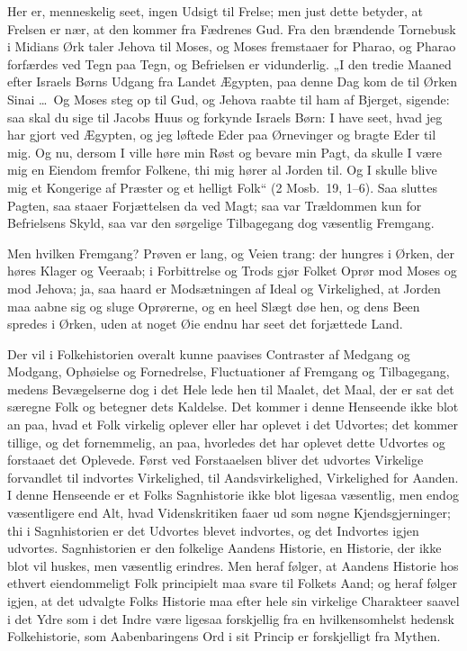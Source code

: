 \documentclass[12pt]{book}
\begin{document}
Her er, menneskelig seet, ingen Udsigt til Frelse; men just dette
betyder, at Frelsen er nær, at den kommer fra Fædrenes Gud. Fra den
brændende Tornebusk i Midians Ørk taler Jehova til Moses, og Moses
fremstaaer for Pharao, og Pharao forfærdes ved Tegn paa Tegn, og
Befrielsen er vidunderlig. „I den tredie Maaned efter Israels Børns
Udgang fra Landet Ægypten, paa denne Dag kom de til Ørken Sinai
\dots\ Og Moses steg op til Gud, og Jehova raabte til ham af
Bjerget, sigende: saa skal du sige til Jacobs Huus og forkynde
Israels Børn: I have seet, hvad jeg har gjort ved Ægypten, og jeg
løftede Eder paa Ørnevinger og bragte Eder til mig. Og nu, dersom I
ville høre min Røst og bevare min Pagt, da skulle I være mig en
Eiendom fremfor Folkene, thi mig hører al Jorden til. Og I skulle
blive mig et Kongerige af Præster og et helligt Folk“ (2 Mosb.\ 19,
1--6). Saa sluttes Pagten, saa staaer Forjættelsen da ved Magt; saa
var Trældommen kun for Befrielsens Skyld, saa var den sørgelige
Tilbagegang dog væsentlig Fremgang.

Men hvilken Fremgang? Prøven er lang, og Veien trang: der hungres i
Ørken, der høres Klager og Veeraab; i Forbittrelse og Trods gjør
Folket Oprør mod Moses og mod Jehova; ja, saa haard er Modsætningen
af Ideal og Virkelighed, at Jorden maa aabne sig og sluge Oprørerne,
og en heel Slægt døe hen, og dens Been
spredes i Ørken, uden at noget Øie endnu har seet det forjættede
Land.

Der vil i Folkehistorien overalt kunne paavises Contraster af
Medgang og Modgang, Ophøielse og Fornedrelse, Fluctuationer af
Fremgang og Tilbagegang, medens Bevægelserne dog i det Hele lede hen
til Maalet, det Maal, der er sat det særegne Folk og betegner dets
Kaldelse. Det kommer i denne Henseende ikke blot an paa, hvad et
Folk virkelig oplever eller har oplevet i det Udvortes; det kommer
tillige, og det fornemmelig, an paa, hvorledes det har oplevet dette
Udvortes og forstaaet det Oplevede. Først ved Forstaaelsen bliver
det udvortes Virkelige forvandlet til indvortes Virkelighed, til
Aandsvirkelighed, Virkelighed for Aanden. I denne Henseende er et
Folks Sagnhistorie ikke blot ligesaa væsentlig, men endog
væsentligere end Alt, hvad Videnskritiken faaer ud som nøgne
Kjendsgjerninger; thi i Sagnhistorien er det Udvortes blevet
indvortes, og det Indvortes igjen udvortes. Sagnhistorien er den
folkelige Aandens Historie, en Historie, der ikke blot vil huskes,
men væsentlig erindres. Men heraf følger, at Aandens Historie hos
ethvert eiendommeligt Folk principielt maa svare til Folkets Aand;
og heraf følger igjen, at det udvalgte Folks Historie maa efter hele
sin virkelige Charakteer saavel i det Ydre som i det Indre være
ligesaa forskjellig fra en hvilkensomhelst hedensk Folkehistorie,
som Aabenbaringens Ord i sit Princip er forskjelligt fra Mythen.
\end{document}
